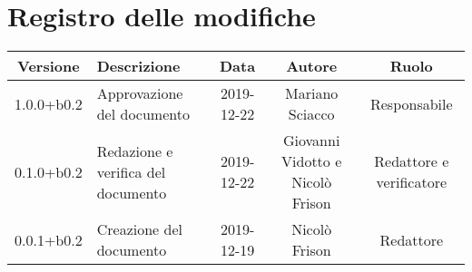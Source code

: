 \section*{Registro delle modifiche}

\begin{center}
	\begin{longtable}{|c|p{3cm}|c|c|c|}
	\hline
	\rowcolor{lighter-grayer}
	\textbf{Versione} & \textbf{Descrizione} & \textbf{Data} & \textbf{Autore} & \textbf{Ruolo} \\
	\hline
	\endfirsthead


	1.0.0+b0.2 & Approvazione del documento & 2019-12-22 & Mariano Sciacco & Responsabile \\
	\hline
	0.1.0+b0.2 & Redazione e verifica del documento & 2019-12-22 & Giovanni Vidotto e Nicolò Frison & Redattore e verificatore \\
	\hline
	0.0.1+b0.2 & Creazione del documento & 2019-12-19 & Nicolò Frison & Redattore \\
	\hline

	\end{longtable}
\end{center}